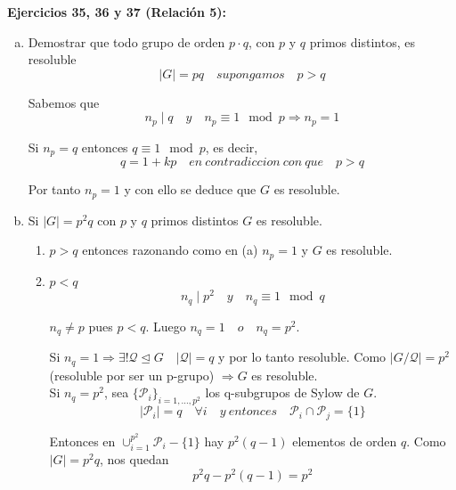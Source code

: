 \documentclass{article}
\begin{document}
\textbf{Ejercicios 35, 36 y 37 (Relación 5):}
\begin{enumerate}[(a)]
\item Demostrar que todo grupo de orden $p\cdot q$, con $p$ y $q$ primos distintos, es resoluble
\begin{equation*}
|G|=pq\quad supongamos\quad p>q
\end{equation*}

Sabemos que 
\begin{equation*}
n_p\mid q\quad y\quad n_p\equiv 1\mod{p} \Rightarrow n_p=1
\end{equation*}

Si $n_p=q$ entonces $q\equiv 1 \mod{p}$, es decir,
\begin{equation*}
q=1+kp\quad en\:contradiccion\:con\:que\quad p>q
\end{equation*}

Por tanto $n_p=1$ y con ello se deduce que $G$ es resoluble.

\item Si $|G|=p^2q$ con $p$ y $q$ primos distintos $G$ es resoluble.
	\begin{enumerate}[\bfseries C{a}so 1:]
	\item $p>q$ entonces razonando como en (a) $n_p=1$ y $G$ es resoluble.
	
	\item $p<q$
	\begin{equation*}
	n_q\mid p^2\quad y\quad n_q\equiv 1 \mod{q}
	\end{equation*}
	
	$n_q\neq p$ pues $p<q$. Luego $n_q=1\quad o\quad n_q=p^2$.
	
	Si $n_q=1\Rightarrow \exists!\mathcal{Q}\unlhd G \quad |\mathcal{Q}|=q$ y por lo tanto resoluble. Como $|G/\mathcal{Q}|=p^2$ (resoluble por ser un p-grupo) $\Rightarrow G$ es resoluble. \\
	
	Si $n_q=p^2$, sea $\{\mathcal{P}_i\}_{i=1,\ldots,p^2}$ los q-subgrupos de Sylow de $G$.
	\begin{equation*}
	|\mathcal{P}_i|=q\quad \forall i\quad y\:entonces\quad \mathcal{P}_i\cap \mathcal{P}_j=\{1\}
	\end{equation*}	
	
	Entonces en $\cup_{i=1}^{p^2} \mathcal{P}_i -\{1\}$ hay $p^2(q-1)$ elementos de orden $q$. Como $|G|=p^2q$, nos quedan
	\begin{equation*}
	p^2q-p^2(q-1)=p^2
	\end{equation*}	
	

\end{enumerate}
\end{enumerate}
\end{document}
